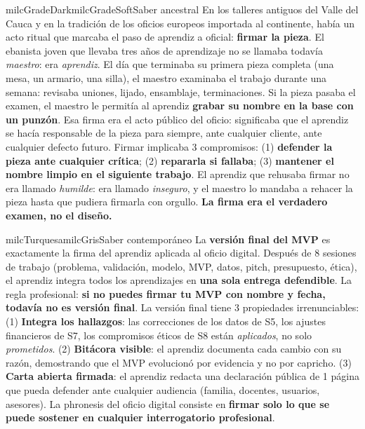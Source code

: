 \documentclass[11pt,letterpaper]{article}
\begin{document}
\begin{softbox}{milcGradeDark}{milcGradeSoft}{Saber ancestral}
En los talleres antiguos del Valle del Cauca y en la tradición de los oficios europeos importada al continente, había un acto ritual que marcaba el paso de aprendiz a oficial: \textbf{firmar la pieza}. El ebanista joven que llevaba tres años de aprendizaje no se llamaba todavía \emph{maestro}: era \emph{aprendiz}. El día que terminaba su primera pieza completa (una mesa, un armario, una silla), el maestro examinaba el trabajo durante una semana: revisaba uniones, lijado, ensamblaje, terminaciones. Si la pieza pasaba el examen, el maestro le permitía al aprendiz \textbf{grabar su nombre en la base con un punzón}. Esa firma era el acto público del oficio: significaba que el aprendiz se hacía responsable de la pieza para siempre, ante cualquier cliente, ante cualquier defecto futuro. Firmar implicaba 3 compromisos: (1) \textbf{defender la pieza ante cualquier crítica}; (2) \textbf{repararla si fallaba}; (3) \textbf{mantener el nombre limpio en el siguiente trabajo}. El aprendiz que rehusaba firmar no era llamado \emph{humilde}: era llamado \emph{inseguro}, y el maestro lo mandaba a rehacer la pieza hasta que pudiera firmarla con orgullo. \textbf{La firma era el verdadero examen, no el diseño.}
\end{softbox}

\begin{softbox}{milcTurquesa}{milcGris}{Saber contemporáneo}
La \textbf{versión final del MVP} es exactamente la firma del aprendiz aplicada al oficio digital. Después de 8 sesiones de trabajo (problema, validación, modelo, MVP, datos, pitch, presupuesto, ética), el aprendiz integra todos los aprendizajes en \textbf{una sola entrega defendible}. La regla profesional: \textbf{si no puedes firmar tu MVP con nombre y fecha, todavía no es versión final}. La versión final tiene 3 propiedades irrenunciables: (1) \textbf{Integra los hallazgos}: las correcciones de los datos de S5, los ajustes financieros de S7, los compromisos éticos de S8 están \emph{aplicados}, no solo \emph{prometidos}. (2) \textbf{Bitácora visible}: el aprendiz documenta cada cambio con su razón, demostrando que el MVP evolucionó por evidencia y no por capricho. (3) \textbf{Carta abierta firmada}: el aprendiz redacta una declaración pública de 1 página que pueda defender ante cualquier audiencia (familia, docentes, usuarios, asesores). La phronesis del oficio digital consiste en \textbf{firmar solo lo que se puede sostener en cualquier interrogatorio profesional}.
\end{softbox}
\end{document}
